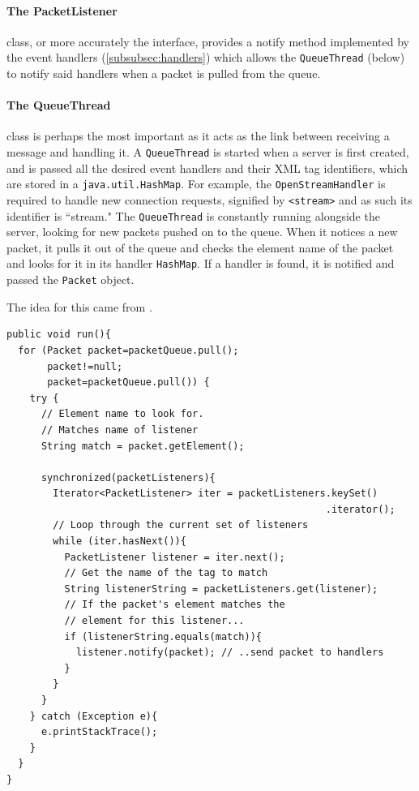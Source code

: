       \paragraph{The PacketListener} class, or more accurately the interface, provides a notify method implemented by the event handlers (\textsection\ref{subsubsec:handlers}) which allows the \verb!QueueThread! (below) to notify said handlers when a packet is pulled from the queue.
      
      \paragraph{The QueueThread} class is perhaps the most important as it acts as the link between receiving a message and handling it. A \verb!QueueThread! is started when a server is first created, and is passed all the desired event handlers and their XML tag identifiers, which are stored in a \verb!java.util.HashMap!. For example, the \verb!OpenStreamHandler! is required to handle new connection requests, signified by \verb!<stream>! and as such its identifier is ``stream." The \verb!QueueThread! is constantly running alongside the server, looking for new packets pushed on to the queue. When it notices a new packet, it pulls it out of the queue and checks the element name of the packet and looks for it in its handler \verb!HashMap!. If a handler is found, it is notified and passed the \verb!Packet! object.
      
      The idea for this came from \cite{Shigeoka:2002ys}. \\
      
      \begin{lstlisting}
public void run(){
  for (Packet packet=packetQueue.pull();
       packet!=null;
       packet=packetQueue.pull()) {
    try {
      // Element name to look for.
      // Matches name of listener
      String match = packet.getElement();

      synchronized(packetListeners){
        Iterator<PacketListener> iter = packetListeners.keySet()
                                                       .iterator();
        // Loop through the current set of listeners
        while (iter.hasNext()){
          PacketListener listener = iter.next();
          // Get the name of the tag to match
          String listenerString = packetListeners.get(listener);
          // If the packet's element matches the
          // element for this listener...
          if (listenerString.equals(match)){
            listener.notify(packet); // ..send packet to handlers
          } 
        } 
      } 
    } catch (Exception e){
      e.printStackTrace();
    }
  } 
} 
\end{lstlisting}
      
